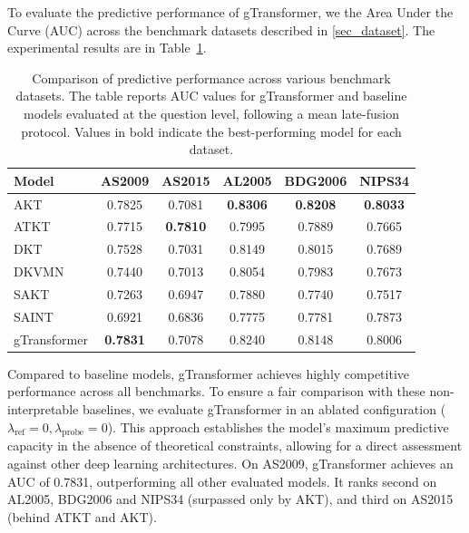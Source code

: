 \documentclass[applsci,article,submit,moreauthors,pdftex]{Definitions/mdpi}
\begin{document}
To evaluate the predictive performance of gTransformer, we  the Area Under the Curve (AUC) across the benchmark datasets described in \cref{sec_dataset}. The experimental results are  in Table~\ref{tab_performance}.

\begin{table}[htbp]
\centering
\begin{tabularx}{\textwidth}{lccccc}
\toprule
\textbf{Model} & \textbf{AS2009} & \textbf{AS2015} & \textbf{AL2005} & \textbf{BDG2006} & \textbf{NIPS34} \\
\midrule
AKT & 0.7825 & 0.7081 & \textbf{0.8306} & \textbf{0.8208} & \textbf{0.8033} \\
ATKT & 0.7715 & \textbf{0.7810} & 0.7995 & 0.7889 & 0.7665 \\
DKT & 0.7528 & 0.7031 & 0.8149 & 0.8015 & 0.7689 \\
DKVMN & 0.7440 & 0.7013 & 0.8054 & 0.7983 & 0.7673 \\
SAKT & 0.7263 & 0.6947 & 0.7880 & 0.7740 & 0.7517 \\
SAINT & 0.6921 & 0.6836 & 0.7775 & 0.7781 & 0.7873 \\
\midrule
gTransformer & \textbf{0.7831} & 0.7078 & 0.8240 & 0.8148 & 0.8006 \\
\bottomrule
\end{tabularx}
\vspace{2mm}
\raggedright
\caption{Comparison of predictive performance across various benchmark datasets. The table reports AUC values for gTransformer and baseline models evaluated at the question level, following a mean late-fusion protocol. Values in bold indicate the best-performing model for each dataset. \label{tab_performance}}
\end{table}

Compared to baseline models, gTransformer achieves highly competitive performance across all benchmarks. To ensure a fair comparison with these non-interpretable baselines, we evaluate gTransformer in an ablated configuration ($\lambda_{\text{ref}} = 0, \lambda_{\text{probe}} = 0$). This approach establishes the model's maximum predictive capacity in the absence of theoretical constraints, allowing for a direct assessment against other deep learning architectures. On AS2009, gTransformer achieves an AUC of 0.7831, outperforming all other evaluated models. It ranks second on AL2005, BDG2006 and NIPS34 (surpassed only by AKT), and third on AS2015 (behind ATKT and AKT). 
\end{document}
